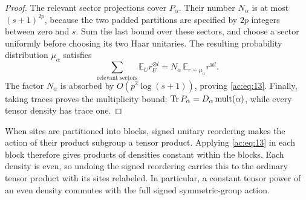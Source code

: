 \begin{proof}
The relevant sector projections cover \(P_\alpha\). Their number
\(N_\alpha\) is at most \((s+1)^{2p}\), because the two padded partitions
are specified by \(2p\) integers between zero and \(s\). Sum the last
bound over these sectors, and choose a sector uniformly before choosing
its two Haar unitaries. The resulting probability distribution
\(\mu_\alpha\) satisfies
\[
 \sum_{\text{relevant sectors}}\mathbb E_U r_U^{\otimes l}
 =N_\alpha\,\mathbb E_{r\sim\mu_\alpha}r^{\otimes l}.
\]
The factor \(N_\alpha\) is absorbed by \(O(p^2\log(s+1))\), proving
\eqref{ac:eq:13}. Finally, taking traces proves the multiplicity bound:
\(\operatorname{Tr} P_\alpha=D_\alpha\operatorname{mult}(\alpha)\), while every tensor
density has trace one.
\end{proof}

When sites are partitioned into blocks, signed unitary reordering makes
the action of their product subgroup a tensor product. Applying
\eqref{ac:eq:13} in each block therefore gives products of densities
constant within the blocks. Each density is even, so undoing the signed
reordering carries this to the ordinary tensor product with its sites
relabeled. In particular, a constant tensor power of an even density
commutes with the full signed symmetric-group action.
